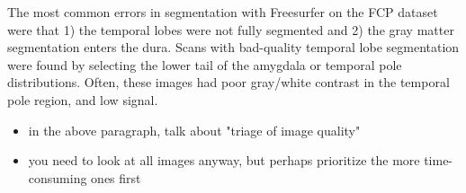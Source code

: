 The most common errors in segmentation with Freesurfer on the FCP dataset were that 1) the temporal lobes were not fully segmented and 2) the gray matter segmentation enters the dura. Scans with bad-quality temporal lobe segmentation were found by selecting the lower tail of the amygdala or temporal pole distributions. Often, these images had poor gray/white contrast in the temporal pole region, and low signal. 

\begin{itemize}
\item in the above paragraph, talk about "triage of image quality" 
\item you need to look at all images anyway, but perhaps prioritize the more time-consuming ones first
\end{itemize}




